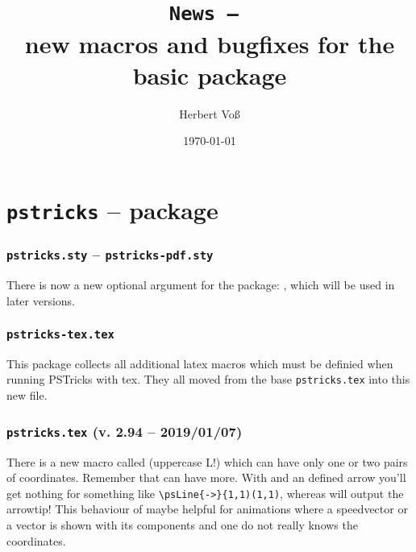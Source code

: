 \documentclass[11pt,english,BCOR=10mm,DIV=12,bibliography=totoc,parskip=false,headings=small,
    headinclude=false,footinclude=false,twoside]{pst-doc}
\begin{document}
\title{\texttt{News -- \the\year}\\ \Large new macros and bugfixes for the
basic package }
\author{Herbert Voß}
\date{\today}

\maketitle

\clearpage
\tableofcontents

\clearpage
\part{\texttt{pstricks} -- package}

\section{\texttt{pstricks.sty} -- \texttt{pstricks-pdf.sty}}

There is now a new optional argument for the package: , which will
be used in later versions. 
 
\section{\texttt{pstricks-tex.tex}}
This package collects all additional latex macros which must be definied
when running PSTricks with tex.  They all moved from the base \texttt{pstricks.tex} into
this new file.


\section{\texttt{pstricks.tex} (v. 2.94 -- 2019/01/07)}

There is a new macro called  (uppercase L!) which can have
only one or two pairs of coordinates. Remember that  can have more.
With  and an defined arrow you'll get nothing for something
like \verb|\psLine{->}{1,1)(1,1)|, whereas  will output the arrowtip!
This behaviour of  maybe helpful for animations where a speedvector
or a vector
is  shown with its components and one do not really knows the coordinates.
\end{document}
